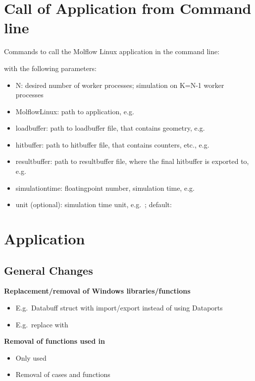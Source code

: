 \section{Call of Application from Command line}

Commands to call the Molflow Linux application in the command line:

\smallskip
with the following parameters:
\begin{itemize}[noitemsep,topsep=0pt]
\item N: desired number of worker processes; simulation on K=N-1 worker processes
\item MolflowLinux: path to application, e.g.\ 
\item loadbuffer: path to loadbuffer file, that contains geometry, e.g.\ 
\item hitbuffer: path to hitbuffer file, that contains counters, etc., e.g.\ 
\item resultbuffer: path to resultbuffer file, where the final hitbuffer is exported to,\\ e.g.\ 
\item simulationtime: floatingpoint number, simulation time, e.g.\ 
\item unit (optional): simulation time unit, e.g.\ ; default: 
\end{itemize}

\section{Application}
\subsection{General Changes}

\textbf{Replacement/removal of Windows libraries/functions}
\begin{itemize}[noitemsep,topsep=0pt]
\item E.g.\ Databuff struct with import/export instead of using Dataports
\item E.g.\ replace  with 
\end{itemize}
\bigskip
\textbf{Removal of functions used in} 
\begin{itemize}[noitemsep,topsep=0pt]
\item Only  used
\item Removal of  cases and functions
\end{itemize}

